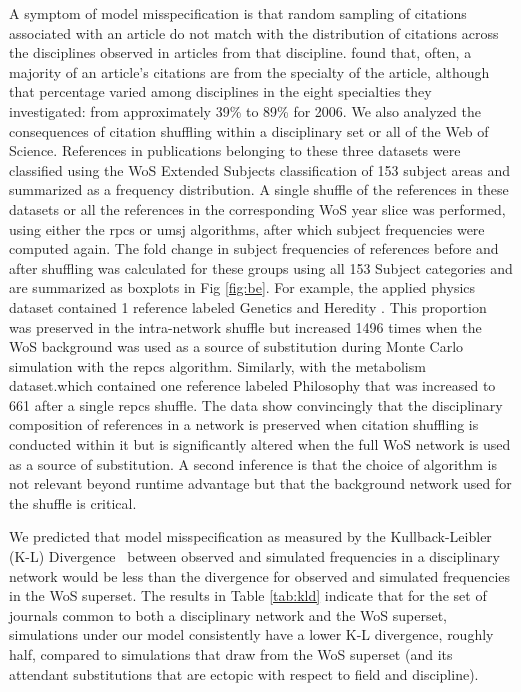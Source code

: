 \documentclass[NETN]{stjour}
\begin{document}
A symptom of model misspecification is that random sampling of citations associated with an article do not match with the distribution of citations across the disciplines observed in articles from that discipline. \cite{wallace_lariviere_gingras_2012} found that, often, a majority of an article's citations are from the specialty of the article, although that percentage varied among disciplines in the eight specialties they investigated: from approximately 39\% to 89\% for 2006. We also analyzed the consequences of citation shuffling within a disciplinary set or all of the Web of Science.  References in publications belonging to these three datasets were classified using the WoS Extended Subjects classification of 153 subject areas and summarized as a frequency distribution. A single shuffle of the references in these datasets or all the references in the corresponding WoS year slice was performed, using either the rpcs or umsj algorithms, after which subject frequencies were computed again. The fold change in subject frequencies of references before and after shuffling was calculated for these groups using all 153 Subject categories and are summarized as boxplots in Fig \ref{fig:be}. For example, the applied physics dataset contained 1 reference labeled Genetics and Heredity . This proportion was preserved in the intra-network shuffle but increased 1496 times when the WoS background was used as a source of substitution during Monte Carlo simulation with the repcs algorithm. Similarly, with the metabolism dataset.which contained one reference labeled Philosophy that was increased to 661 after a single repcs shuffle. The data show convincingly that the disciplinary composition of references in a network is preserved when citation shuffling is conducted within it but is significantly altered when the full WoS network is used as a source of substitution. A second inference is that the choice of algorithm is not relevant beyond runtime advantage but that the background network used for the shuffle is critical.

We predicted that model misspecification as measured by the Kullback-Leibler (K-L) Divergence~\citep{kullback_information_1951} between observed and simulated frequencies in a disciplinary network would be less than the divergence for observed and simulated frequencies in the WoS superset. The results in Table \ref{tab:kld} indicate that for the set of journals common to both a disciplinary network and the WoS superset, simulations under our model consistently have a lower K-L divergence, roughly half, compared to simulations that draw from the WoS superset (and its attendant substitutions that are ectopic with respect to field and discipline).
\end{document}
